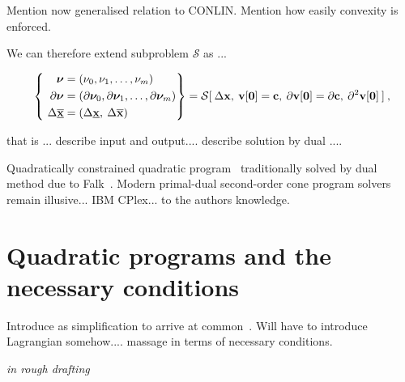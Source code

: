 \documentclass[11pt]{article}
\begin{document}
Mention now generalised relation to CONLIN. Mention how easily convexity is enforced.

We can therefore extend subproblem $\mathcal{S}$ as ... 

\begin{align}
 ~\left\{ ~
\begin{aligned}
\bm{\nu} &= (\nu_0, \nu_1, \ldots, \nu_m )\\
\partial \bm{\nu} & = (\partial \bm{\nu}_0 , \partial \bm{\nu}_1 , \ldots,\partial \bm{\nu}_m  ) \\
\Delta \underline{\overline{\mathbf{x}}} & = ( \Delta \underline{\mathbf{x}} , \: \Delta \overline{\mathbf{x}} ) \:
\end{aligned}\right\} =
\mathcal{S} [ \: \Delta \mathbf{x}, \: \mathbf{v}[\mathbf{0}] = \mathbf{c}, \: \partial \mathbf{v}[\mathbf{0}] = \partial \mathbf{c}, \: \partial^2 \mathbf{v} [\mathbf{0}] \: ] \: ,
\end{align}

that is ... describe input and output.... describe solution by dual .... 


Quadratically constrained quadratic program~\cite{boyd2004convex} traditionally solved by dual method due to Falk~\cite{falk1969lagrange}. Modern primal-dual second-order cone program solvers remain illusive... IBM CPlex... \cite{cplex2009v12} to the authors knowledge.

\section{Quadratic programs and the necessary conditions}

Introduce as simplification to arrive at common~\cite{osqp}. Will have to introduce Lagrangian somehow.... massage in terms of necessary conditions.



\emph{in rough drafting}

\end{document}
